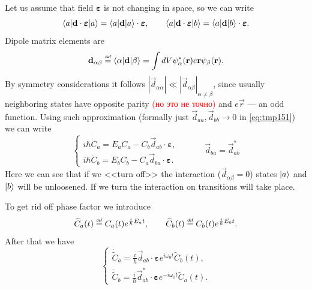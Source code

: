 Let us assume that field $\bm{\varepsilon}$ is not changing in space, so we can write
\begin{equation}
	\langle a\rvert \mathbf{d} \cdot \bm{\varepsilon} \lvert a\rangle = \langle a\rvert \mathbf{d} \lvert a\rangle \cdot \bm{\varepsilon}, \qquad 
	\langle a\rvert \mathbf{d} \cdot \bm{\varepsilon} \lvert b\rangle = \langle a\rvert \mathbf{d} \lvert b\rangle \cdot \bm{\varepsilon}.
\end{equation}
Dipole matrix elements are
\begin{equation}
	\vec{d}_{\alpha \beta} \myeq \bra{\alpha} \vec{d} \ket{\beta} = \int dV \psi_{\alpha}^* (\vec{r}) e \vec{r} \psi_{\beta} (\vec{r}).
\end{equation}
By symmetry considerations it follows  $\left| \vec{d}_{\alpha \alpha} \right| \ll \left| \vec{d}_{\alpha \beta} \right|_{\alpha \neq \beta}$, since usually neighboring states have opposite parity \textcolor{red}{(но это не точно)} and $e \vec{r}$ --- an odd function. Using such approximation (formally just $\vec{d}_{aa}, \vec{d}_{bb} \to 0$ in \eqref{eq:tmp151}) we can write
\begin{equation}
	\begin{cases}
		i \hbar \dot{C}_a = E_a C_a - C_b \vec{d}_{ab} \cdot \bm{\varepsilon}, \\
		i \hbar \dot{C}_b = E_b C_b - C_a \vec{d}_{ba} \cdot \bm{\varepsilon}.
	\end{cases} 
	\qquad \quad \vec{d}_{ba} = \vec{d}_{ab}^*
\end{equation}
Here we can see that if we <<turn off>> the interaction ($\vec{d}_{\alpha \beta} = 0$) states $\lvert a\rangle$ and $\lvert b\rangle$ will be unloosened. If we turn the interaction on transitions will take place. 

To get rid off phase factor we introduce
\begin{equation}
	\widetilde{C}_a (t) \myeq C_a(t) e^{\frac{i}{\hbar}E_a t}, \qquad \widetilde{C}_b (t) \myeq C_b(t) e^{\frac{i}{\hbar}E_bt}.
\end{equation}
After that we have
\begin{equation}
	\begin{cases}
		\dot{\widetilde{C}}_a = \frac{i}{\hbar}\vec{d}_{ab} \cdot \bm{\varepsilon} e^{i \omega_0 t} \widetilde{C}_b(t), \\
		\dot{\widetilde{C}}_b = \frac{i}{\hbar}\vec{d}^*_{ab} \cdot \bm{\varepsilon} e^{-i \omega_0 t} \widetilde{C}_a(t).
	\end{cases} 
\end{equation}


